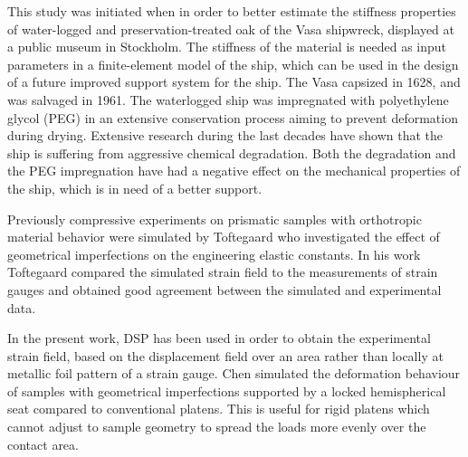 \documentclass[3p]{elsarticle}
\begin{document}
This study was initiated when in order to better estimate the stiffness properties of water-logged and preservation-treated  oak of the Vasa shipwreck, displayed at a public museum in Stockholm. The stiffness of the material is needed as input parameters in a finite-element model of the ship, which can be used in the design of a future improved support system for the ship. The Vasa capsized in 1628, and was salvaged in 1961. 
The waterlogged ship was impregnated with polyethylene glycol (PEG) in an extensive conservation process aiming to prevent deformation during drying. 
Extensive research during the last decades have shown that the ship is suffering
from aggressive chemical degradation. Both the degradation \cite{bjurhager2012state}
and the PEG impregnation \cite{ljungdahl2007transverse} have had a negative effect on the mechanical properties of the ship, which is in need of a better support. \par
Previously compressive experiments on prismatic samples with orthotropic
material behavior were simulated by Toftegaard \cite{Toftegaard1999849} who investigated the effect of geometrical imperfections on the
engineering elastic constants.
In his work Toftegaard compared the simulated strain field to the measurements
of strain gauges and obtained good agreement between the simulated and experimental
data.\par
In the present work, DSP has been used in order to obtain the experimental
strain field, based on the displacement field over an area rather than locally
at metallic foil pattern of a strain gauge.
Chen \cite{Chen001} simulated the deformation behaviour of samples with geometrical
imperfections supported by a locked hemispherical seat compared to conventional platens. This is useful for rigid platens which cannot adjust to sample geometry to spread the loads more evenly over the contact area.
\par 

\end{document}
